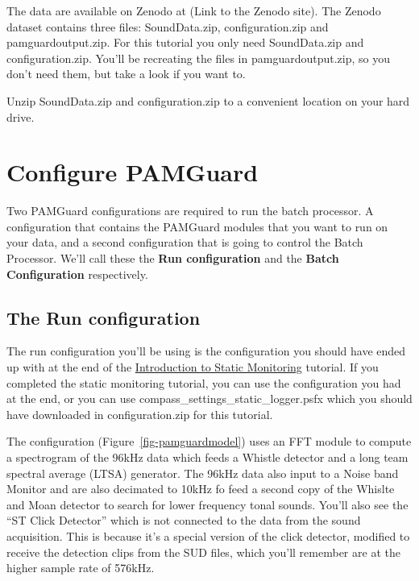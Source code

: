 \documentclass[
]{article}
\begin{document}
The data are available on Zenodo at (Link to the Zenodo site). The
Zenodo dataset contains three files: SoundData.zip, configuration.zip
and pamguardoutput.zip. For this tutorial you only need SoundData.zip
and configuration.zip. You'll be recreating the files in
pamguardoutput.zip, so you don't need them, but take a look if you want
to.

Unzip SoundData.zip and configuration.zip to a convenient location on
your hard drive.

\section{Configure PAMGuard}\label{configure-pamguard}

Two PAMGuard configurations are required to run the batch processor. A
configuration that contains the PAMGuard modules that you want to run on
your data, and a second configuration that is going to control the Batch
Processor. We'll call these the \textbf{Run configuration} and the
\textbf{Batch Configuration} respectively.

\subsection{The Run configuration}\label{the-run-configuration}

The run configuration you'll be using is the configuration you should
have ended up with at the end of the
\href{https://www.pamguard.org/tutorials/staticmonitoring.html}{Introduction
to Static Monitoring} tutorial. If you completed the static monitoring
tutorial, you can use the configuration you had at the end, or you can
use compass\_settings\_static\_logger.psfx which you should have
downloaded in configuration.zip for this tutorial.

The configuration (Figure~\ref{fig-pamguardmodel}) uses an FFT module to
compute a spectrogram of the 96kHz data which feeds a Whistle detector
and a long team spectral average (LTSA) generator. The 96kHz data also
input to a Noise band Monitor and are also decimated to 10kHz fo feed a
second copy of the Whislte and Moan detector to search for lower
frequency tonal sounds. You'll also see the ``ST Click Detector'' which
is not connected to the data from the sound acquisition. This is because
it's a special version of the click detector, modified to receive the
detection clips from the SUD files, which you'll remember are at the
higher sample rate of 576kHz.
\end{document}
